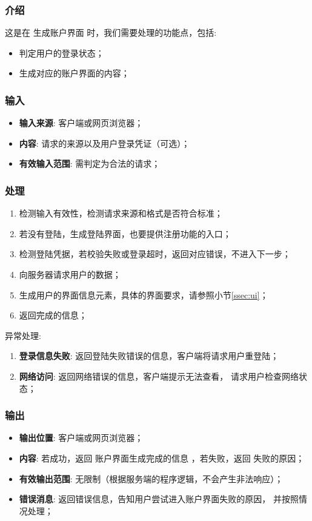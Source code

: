 \begin{enumerate}
\subsubsection{介绍}
	这是在 生成账户界面 时，我们需要处理的功能点，包括: 
	\begin{itemize}
		\item 判定用户的登录状态；
		\item 生成对应的账户界面的内容；
	\end{itemize}
\subsubsection{输入}
	\begin{itemize}
		\item \textbf{输入来源}: 客户端或网页浏览器；
		\item \textbf{内容}: 请求的来源以及用户登录凭证（可选）；
		\item \textbf{有效输入范围}: 需判定为合法的请求；
	\end{itemize}
\subsubsection{处理}
	\begin{enumerate}
		\item 检测输入有效性，检测请求来源和格式是否符合标准；
		\item 若没有登陆，生成登陆界面，也要提供注册功能的入口；
		\item 检测登陆凭据，若校验失败或登录超时，返回对应错误，不进入下一步；
		\item 向服务器请求用户的数据；
		\item 生成用户的界面信息元素，具体的界面要求，请参照小节\ref{ssec:ui}；
		\item 返回完成的信息；
	\end{enumerate}
	\noindent 异常处理: 
	\begin{enumerate}
		\item \textbf{登录信息失败}: 返回登陆失败错误的信息，客户端将请求用户重登陆；
		\item \textbf{网络访问}: 返回网络错误的信息，客户端提示无法查看，
			请求用户检查网络状态；
	\end{enumerate}
\subsubsection{输出}
\begin{itemize}
	\item \textbf{输出位置}: 客户端或网页浏览器；
	\item \textbf{内容}: 若成功，返回 账户界面生成完成的信息 ，若失败，返回 失败的原因；
	\item \textbf{有效输出范围}: 无限制（根据服务端的程序逻辑，不会产生非法响应）；
	\item \textbf{错误消息}: 返回错误信息，告知用户尝试进入账户界面失败的原因，
		并按照情况处理；
\end{itemize}


\end{enumerate}
